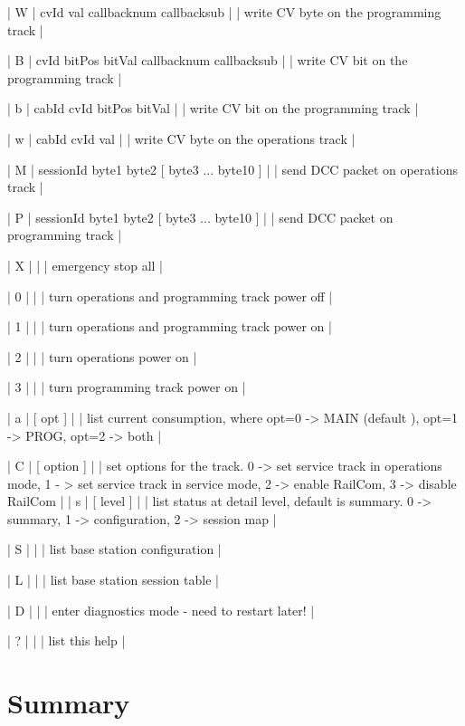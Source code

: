 | W | cvId val callbacknum callbacksub | | write CV byte on the programming track |

| B | cvId bitPos bitVal callbacknum callbacksub | | write CV bit on the programming track |

| b | cabId cvId bitPos bitVal | | write CV bit on the programming track |

| w | cabId cvId val | | write CV byte on the operations track |

| M | sessionId byte1 byte2 [ byte3 ... byte10 ] | | send DCC packet on operations track |

| P | sessionId byte1 byte2 [ byte3 ... byte10 ] | | send DCC packet on programming track |

| X | | | emergency stop all |

| 0 | | | turn operations and programming track power off |

| 1 | | | turn operations and programming track power on |

| 2 | | | turn operations power on |

| 3 | | | turn programming track power on |

| a | [ opt ] | | list current consumption, where opt=0 -> MAIN (default ), opt=1 -> PROG, opt=2 -> both |

| C | [ option ] | | set options for the track. 0 -> set service track in operations mode, 1 - > set service track in service mode, 2 -> enable RailCom, 3 -> disable RailCom |
| s | [ level ] | | list status at detail level, default is summary. 0 -> summary, 1 -> configuration,  2 -> session map |

| S | | | list base station configuration |

| L | | | list base station session table |

| D | | | enter diagnostics mode - need to restart later! |

| ? | | | list this help |

























\section{Summary}

